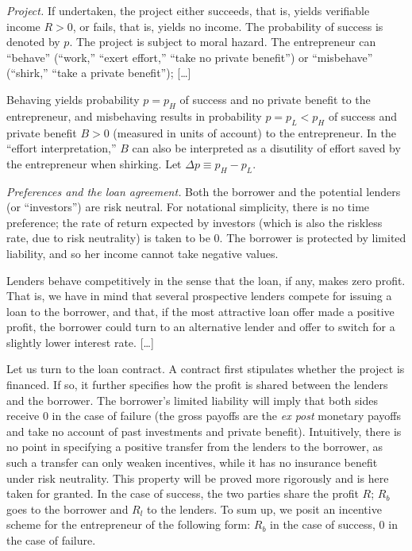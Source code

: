 \documentclass[11pt,a4paper]{article}
\begin{document}
\emph{Project.} If undertaken, the project either succeeds, that is, yields verifiable income
\(R > 0\), or fails, that is, yields no income. The probability of success is denoted by \(p\). The
project is subject to moral hazard. The entrepreneur can ``behave'' (``work,'' ``exert effort,''
``take no private benefit'') or ``misbehave'' (``shirk,'' ``take a private benefit''); {[}\ldots{]}

Behaving yields probability \(p = p_H\) of success and no private benefit to the entrepreneur, and
misbehaving results in probability \(p = p_L < p_H\) of success and private benefit \(B > 0\)
(measured in units of account) to the entrepreneur. In the ``effort interpretation,'' \(B\) can also
be interpreted as a disutility of effort saved by the entrepreneur when shirking. Let
\(\Delta p \equiv p_H - p_L\).

\emph{Preferences and the loan agreement.} Both the borrower and the potential lenders (or
``investors'') are risk neutral. For notational simplicity, there is no time preference; the rate of
return expected by investors (which is also the riskless rate, due to risk neutrality) is taken to
be 0. The borrower is protected by limited liability, and so her income cannot take negative values.

Lenders behave competitively in the sense that the loan, if any, makes zero profit. That is, we have
in mind that several prospective lenders compete for issuing a loan to the borrower, and that, if
the most attractive loan offer made a positive profit, the borrower could turn to an alternative
lender and offer to switch for a slightly lower interest rate. {[}\ldots{]}

Let us turn to the loan contract. A contract first stipulates whether the project is financed. If
so, it further specifies how the profit is shared between the lenders and the borrower. The
borrower's limited liability will imply that both sides receive 0 in the case of failure (the gross
payoffs are the \emph{ex post} monetary payoffs and take no account of past investments and private
benefit). Intuitively, there is no point in specifying a positive transfer from the lenders to the
borrower, as such a transfer can only weaken incentives, while it has no insurance benefit under
risk neutrality. This property will be proved more rigorously and is here taken for granted. In the
case of success, the two parties share the profit \(R\); \(R_b\) goes to the borrower and \(R_l\) to
the lenders. To sum up, we posit an incentive scheme for the entrepreneur of the following form:
\(R_b\) in the case of success, 0 in the case of failure.
\end{document}
